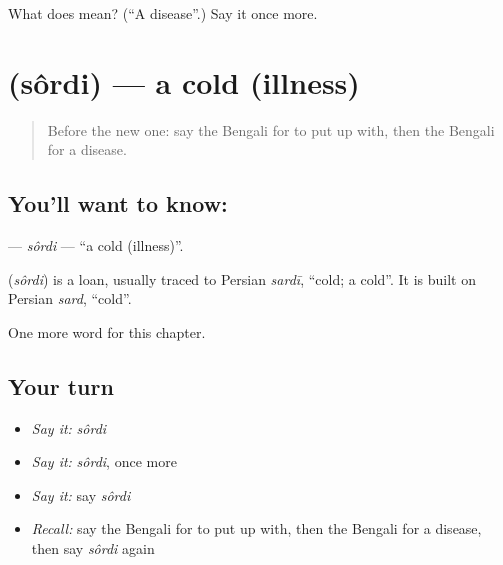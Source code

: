 \begin{tcolorbox}[breakable,colback=teal!4,colframe=teal!35!black,title={Before you move on}]
What does  mean? (\textquotedblleft{}A disease\textquotedblright{}.) Say it once more.
\end{tcolorbox}
\section[\texorpdfstring{\bn{সর্দি} (sôrdi)}{সর্দি (sôrdi)}]{ (sôrdi) — a cold (illness)}

\label{lesson:BN-C154-sordi}



\begin{quote}
Before the new one: say the Bengali for to put up with, then the Bengali for a disease.
\end{quote}

\subsection*{You'll want to know: }
\textbf{} — \emph{sôrdi} — \textquotedblleft{}a cold (illness)\textquotedblright{}.

\begin{cousinweb}
\textbf{} (\emph{sôrdi}) is a loan, usually traced to Persian \emph{sardī}, \textquotedblleft{}cold; a cold\textquotedblright{}. It is built on Persian \emph{sard}, \textquotedblleft{}cold\textquotedblright{}.
\end{cousinweb}

\begin{grammarlens}[title={What you've built}]
One more word for this chapter.
\end{grammarlens}

\subsection*{Your turn}
\begin{itemize}
\raggedright
  \item \emph{Say it:} \emph{sôrdi}
  \item \emph{Say it:} \emph{sôrdi}, once more
  \item \emph{Say it:} say \emph{sôrdi}
  \item \emph{Recall:} say the Bengali for to put up with, then the Bengali for a disease, then say \emph{sôrdi} again
\end{itemize}

